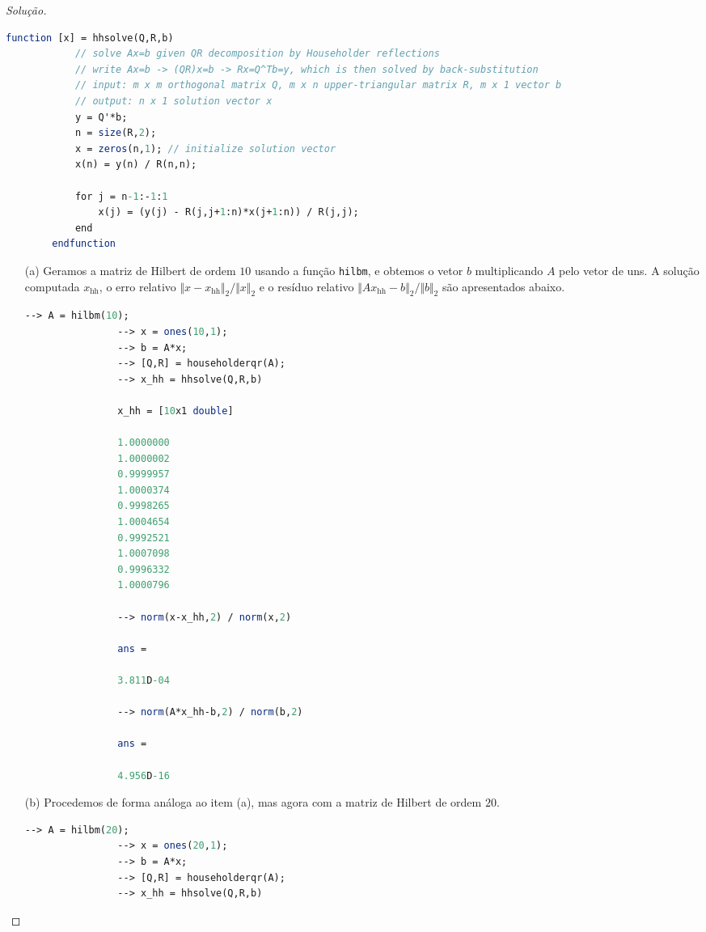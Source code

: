 \documentclass{article}
\begin{document}
\begin{proof}[Solução]
    \begin{lstlisting}[language=Scilab, caption={Resolução de \(Ax=b\) usando decomposição QR de Householder}]
        function [x] = hhsolve(Q,R,b)
            // solve Ax=b given QR decomposition by Householder reflections
            // write Ax=b -> (QR)x=b -> Rx=Q^Tb=y, which is then solved by back-substitution
            // input: m x m orthogonal matrix Q, m x n upper-triangular matrix R, m x 1 vector b
            // output: n x 1 solution vector x
            y = Q'*b;
            n = size(R,2);
            x = zeros(n,1); // initialize solution vector
            x(n) = y(n) / R(n,n);
            
            for j = n-1:-1:1
                x(j) = (y(j) - R(j,j+1:n)*x(j+1:n)) / R(j,j);
            end
        endfunction
    \end{lstlisting}

    \begin{itemize}
        \item [(a)] Geramos a matriz de Hilbert de ordem \(10\) usando a função \texttt{hilbm}, e obtemos o vetor \(b\) multiplicando \(A\) pelo vetor de uns. A solução computada \(x_{\text{hh}}\), o erro relativo \(\Vert x - x_{\text{hh}} \Vert_2 / \Vert x \Vert_2\) e o resíduo relativo \(\Vert A x_{\text{hh}} - b \Vert_2 / \Vert b \Vert_2\) são apresentados abaixo.
            \begin{lstlisting}[language=Scilab, caption={Solução de \(Ax=b\) para \(A\) sendo a matriz de Hilbert de ordem 10}]
                --> A = hilbm(10);
                --> x = ones(10,1);
                --> b = A*x;
                --> [Q,R] = householderqr(A);
                --> x_hh = hhsolve(Q,R,b)

                x_hh = [10x1 double]

                1.0000000
                1.0000002
                0.9999957
                1.0000374
                0.9998265
                1.0004654
                0.9992521
                1.0007098
                0.9996332
                1.0000796

                --> norm(x-x_hh,2) / norm(x,2)

                ans = 

                3.811D-04

                --> norm(A*x_hh-b,2) / norm(b,2)

                ans = 

                4.956D-16
            \end{lstlisting}
        \item [(b)] Procedemos de forma análoga ao item (a), mas agora com a matriz de Hilbert de ordem \(20\).
            \begin{lstlisting}[language=Scilab, caption={Solução de \(Ax=b\) para \(A\) sendo a matriz de Hilbert de ordem 20}]
                --> A = hilbm(20);
                --> x = ones(20,1);
                --> b = A*x;
                --> [Q,R] = householderqr(A);
                --> x_hh = hhsolve(Q,R,b)


\end{lstlisting}
\end{itemize}
\end{proof}
\end{document}
